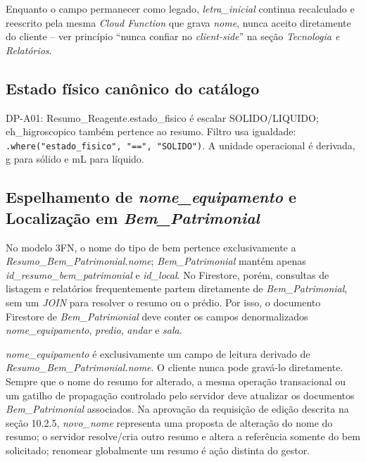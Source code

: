 \begin{regra}
Enquanto o campo permanecer como legado, \textit{letra\_inicial} continua
recalculado e reescrito pela mesma \textit{Cloud Function} que grava
\textit{nome}, nunca aceito diretamente do cliente -- ver princípio ``nunca
confiar no \textit{client-side}'' na seção \textit{Tecnologia e Relatórios}.
\end{regra}

\subsection{Estado físico canônico do catálogo}
DP-A01: Resumo\_Reagente.estado\_fisico é escalar SOLIDO/LIQUIDO; eh\_higroscopico também pertence ao resumo. Filtro usa igualdade: \texttt{.where("estado\_fisico", "==", "SOLIDO")}. A unidade operacional é derivada, g para sólido e mL para líquido.

\subsection{Espelhamento de \textit{nome\_equipamento} e Localização em \textit{Bem\_Patrimonial}}
No modelo 3FN, o nome do tipo de bem pertence exclusivamente a \textit{Resumo\_Bem\_Patrimonial.nome}; \textit{Bem\_Patrimonial} mantém apenas \textit{id\_resumo\_bem\_patrimonial} e \textit{id\_local}. No Firestore, porém, consultas de listagem e relatórios frequentemente partem diretamente de \textit{Bem\_Patrimonial}, sem um \textit{JOIN} para resolver o resumo ou o prédio. Por isso, o documento Firestore de \textit{Bem\_Patrimonial} deve conter os campos denormalizados \textit{nome\_equipamento}, \textit{predio}, \textit{andar} e \textit{sala}.

\begin{regra}
\textit{nome\_equipamento} é exclusivamente um campo de leitura derivado de \textit{Resumo\_Bem\_Patrimonial.nome}. O cliente nunca pode gravá-lo diretamente. Sempre que o nome do resumo for alterado, a mesma operação transacional ou um gatilho de propagação controlado pelo servidor deve atualizar os documentos \textit{Bem\_Patrimonial} associados. Na aprovação da requisição de edição descrita na seção 10.2.5, \textit{novo\_nome} representa uma proposta de alteração do nome do resumo; o servidor resolve/cria outro resumo e altera a referência somente do bem solicitado; renomear globalmente um resumo é ação distinta do gestor.
\end{regra}

